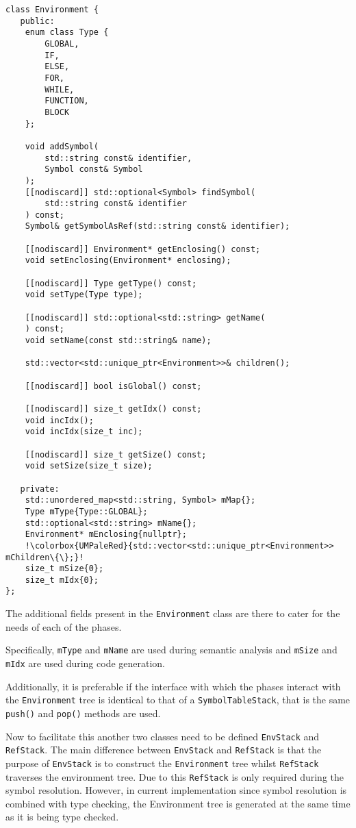 \begin{lstlisting}[escapechar=!,caption={The
\texttt{Environment} class with \texttt{mChildren} highlighted
(backend/Environment.hpp)}, label=lst:envclass]
class Environment {
   public:
    enum class Type {
        GLOBAL,
        IF,
        ELSE,
        FOR,
        WHILE,
        FUNCTION,
        BLOCK
    };

    void addSymbol(
        std::string const& identifier,
        Symbol const& Symbol
    );
    [[nodiscard]] std::optional<Symbol> findSymbol(
        std::string const& identifier
    ) const;
    Symbol& getSymbolAsRef(std::string const& identifier);

    [[nodiscard]] Environment* getEnclosing() const;
    void setEnclosing(Environment* enclosing);

    [[nodiscard]] Type getType() const;
    void setType(Type type);

    [[nodiscard]] std::optional<std::string> getName(
    ) const;
    void setName(const std::string& name);

    std::vector<std::unique_ptr<Environment>>& children();

    [[nodiscard]] bool isGlobal() const;

    [[nodiscard]] size_t getIdx() const;
    void incIdx();
    void incIdx(size_t inc);

    [[nodiscard]] size_t getSize() const;
    void setSize(size_t size);

   private:
    std::unordered_map<std::string, Symbol> mMap{};
    Type mType{Type::GLOBAL};
    std::optional<std::string> mName{};
    Environment* mEnclosing{nullptr};
    !\colorbox{UMPaleRed}{std::vector<std::unique_ptr<Environment>> mChildren\{\};}!
    size_t mSize{0};
    size_t mIdx{0};
};
\end{lstlisting}

The additional fields present in the \texttt{Environment} class
are there to cater for the needs of each of the phases.

Specifically, \texttt{mType} and \texttt{mName} are used during
semantic analysis and \texttt{mSize} and \texttt{mIdx} are used
during code generation.

Additionally, it is preferable if the interface with which the
phases interact with the \texttt{Environment} tree is identical
to that of a \texttt{SymbolTableStack}, that is the same
\texttt{push()} and \texttt{pop()} methods are used.

Now to facilitate this another two classes need to be defined
\texttt{EnvStack} and \texttt{RefStack}. The main difference
between \texttt{EnvStack} and \texttt{RefStack} is that the
purpose of \texttt{EnvStack} is to construct the
\texttt{Environment} tree whilst \texttt{RefStack} traverses the
environment tree. Due to this \texttt{RefStack} is only required
during the symbol resolution. However, in current implementation
since symbol resolution is combined with type checking, the
Environment tree is generated at the same time as it is being
type checked.

